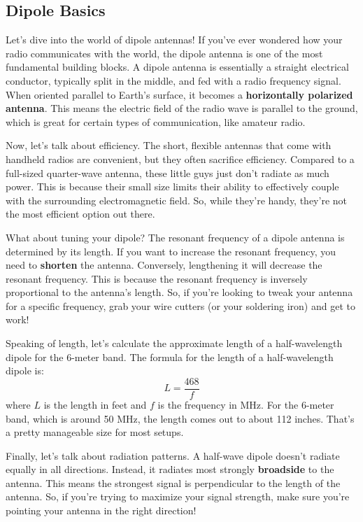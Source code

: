 \subsection{Dipole Basics}
\label{subsec:dipole}

Let's dive into the world of dipole antennas! If you've ever wondered how your radio communicates with the world, the dipole antenna is one of the most fundamental building blocks. A dipole antenna is essentially a straight electrical conductor, typically split in the middle, and fed with a radio frequency signal. When oriented parallel to Earth's surface, it becomes a \textbf{horizontally polarized antenna}. This means the electric field of the radio wave is parallel to the ground, which is great for certain types of communication, like amateur radio.

Now, let's talk about efficiency. The short, flexible antennas that come with handheld radios are convenient, but they often sacrifice efficiency. Compared to a full-sized quarter-wave antenna, these little guys just don't radiate as much power. This is because their small size limits their ability to effectively couple with the surrounding electromagnetic field. So, while they're handy, they're not the most efficient option out there.

What about tuning your dipole? The resonant frequency of a dipole antenna is determined by its length. If you want to increase the resonant frequency, you need to \textbf{shorten} the antenna. Conversely, lengthening it will decrease the resonant frequency. This is because the resonant frequency is inversely proportional to the antenna's length. So, if you're looking to tweak your antenna for a specific frequency, grab your wire cutters (or your soldering iron) and get to work!

Speaking of length, let's calculate the approximate length of a half-wavelength dipole for the 6-meter band. The formula for the length of a half-wavelength dipole is:
\begin{equation}
L = \frac{468}{f}
\end{equation}
where \( L \) is the length in feet and \( f \) is the frequency in MHz. For the 6-meter band, which is around 50 MHz, the length comes out to about 112 inches. That's a pretty manageable size for most setups.

Finally, let's talk about radiation patterns. A half-wave dipole doesn't radiate equally in all directions. Instead, it radiates most strongly \textbf{broadside} to the antenna. This means the strongest signal is perpendicular to the length of the antenna. So, if you're trying to maximize your signal strength, make sure you're pointing your antenna in the right direction!

